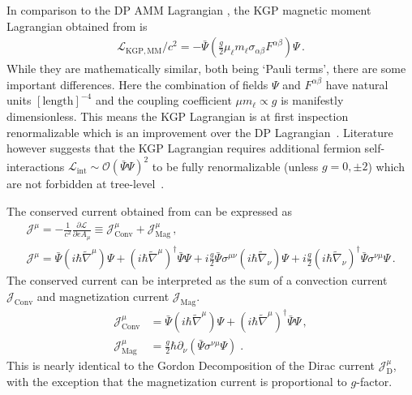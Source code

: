 In comparison to the DP AMM Lagrangian , the KGP magnetic moment Lagrangian obtained from  is
\begin{align}
    \label{lagrangian:2}
    \mathcal{L}_\mathrm{KGP,MM}/c^{2} = -{\bar\Psi}\left(\frac{g}{2}\mu_{\ell} m_{\ell}\sigma_{\alpha\beta}F^{\alpha\beta}\right)\Psi\,.
\end{align}
While they are mathematically similar, both being `Pauli terms', there are some important differences. Here the combination of fields $\Psi$ and $F^{\alpha\beta}$ have natural units $[\mathrm{length}]^{-4}$ and the coupling coefficient $\mu m_{\ell}\!\propto\!g$ is manifestly dimensionless. This means the KGP Lagrangian is at first inspection renormalizable which is an improvement over the DP Lagrangian~\citep{Rafelski:2022bsv}. Literature however suggests that the KGP Lagrangian requires additional fermion self-interactions $\mathcal{L}_\mathrm{int}\sim\mathcal{O}(\bar\Psi\Psi)^{2}$ to be fully renormalizable (unless $g\!=\!0,\pm2$) which are not forbidden at tree-level~\citep{Angeles-Martinez:2011wpn,Vaquera-Araujo:2012jlk}.

The conserved current obtained from  can be expressed as
\begin{gather}
\label{norm:2}
\mathcal{J}^{\mu}=-\frac{1}{c^{2}}\frac{\partial\mathcal{L}}{\partial eA_{\mu}}\equiv 
 \mathcal{J}^\mu_{\mathrm{Conv}}+\mathcal{J}^\mu_{\mathrm{Mag}}\,, \\
\mathcal{J}^{\mu}=\bar{\Psi}\left(i\hbar{\widetilde\nabla}^{\mu}\right)\Psi + \left(i\hbar{\widetilde\nabla}^{\mu}\right)^{\dag}\bar{\Psi}\Psi + i\frac{g}{2}\bar{\Psi}\sigma^{\mu\nu}\left(i\hbar{\widetilde\nabla}_{\nu}\right)\Psi + i\frac{g}{2}\left(i\hbar{\widetilde\nabla}_{\nu}\right)^{\dag}\bar{\Psi}\sigma^{\nu\mu}\Psi\,.
\end{gather}
The conserved current  can be interpreted as the sum of a convection current $\mathcal{J}_{\mathrm{Conv}}$ and magnetization current $\mathcal{J}_{\mathrm{Mag}}$.
\begin{align}
\label{norm:3a}\mathcal{J}^{\mu}_{\mathrm{Conv}}&=\bar{\Psi}\left(i\hbar{\widetilde\nabla}^{\mu}\right)\Psi + \left(i\hbar{\widetilde\nabla}^{\mu}\right)^{\dag}\bar{\Psi}\Psi\,,\\
\label{norm:3b} 
\mathcal{J}^{\mu}_{\mathrm{Mag}}&=\frac{g}{2}\hbar{\partial}_{\nu}\left(\bar{\Psi}\sigma^{\nu\mu}\Psi\right)\;.
\end{align}
 This is nearly identical to the Gordon Decomposition of the Dirac current $\mathcal{J}_\mathrm{D}^{\mu}$, with the exception that the magnetization current is proportional to $g$-factor.
 
